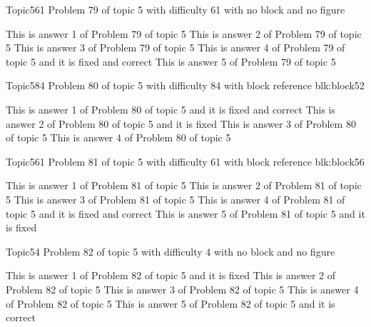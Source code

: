 \documentclass[master]{exam}
\begin{document}
\begin{problem}{Topic5}{61}
	Problem 79 of topic 5 with difficulty 61 with no block and no figure
	\begin{answers}
		\answer This is answer 1 of Problem 79 of topic 5 
		\answer This is answer 2 of Problem 79 of topic 5 
		\answer This is answer 3 of Problem 79 of topic 5 
		 This is answer 4 of Problem 79 of topic 5 and it is fixed and correct
		\answer This is answer 5 of Problem 79 of topic 5 
	\end{answers}
\end{problem}

\begin{problem}[requires=blk:block52]{Topic5}{84}
	Problem 80 of topic 5 with difficulty 84 with block reference blk:block52
	\begin{answers}
		 This is answer 1 of Problem 80 of topic 5 and it is fixed and correct
		\answer[fixed] This is answer 2 of Problem 80 of topic 5 and it is fixed
		\answer This is answer 3 of Problem 80 of topic 5 
		\answer This is answer 4 of Problem 80 of topic 5 
	\end{answers}
\end{problem}

\begin{problem}[requires=blk:block56]{Topic5}{61}
	Problem 81 of topic 5 with difficulty 61 with block reference blk:block56
	\begin{answers}
		\answer This is answer 1 of Problem 81 of topic 5 
		\answer This is answer 2 of Problem 81 of topic 5 
		\answer This is answer 3 of Problem 81 of topic 5 
		 This is answer 4 of Problem 81 of topic 5 and it is fixed and correct
		\answer[fixed] This is answer 5 of Problem 81 of topic 5 and it is fixed
	\end{answers}
\end{problem}

\begin{problem}{Topic5}{4}
	Problem 82 of topic 5 with difficulty 4 with no block and no figure
	\begin{answers}
		\answer[fixed] This is answer 1 of Problem 82 of topic 5 and it is fixed
		\answer This is answer 2 of Problem 82 of topic 5 
		\answer This is answer 3 of Problem 82 of topic 5 
		\answer This is answer 4 of Problem 82 of topic 5 
		\answer[correct] This is answer 5 of Problem 82 of topic 5 and it is correct
	\end{answers}
\end{problem}
\end{document}
